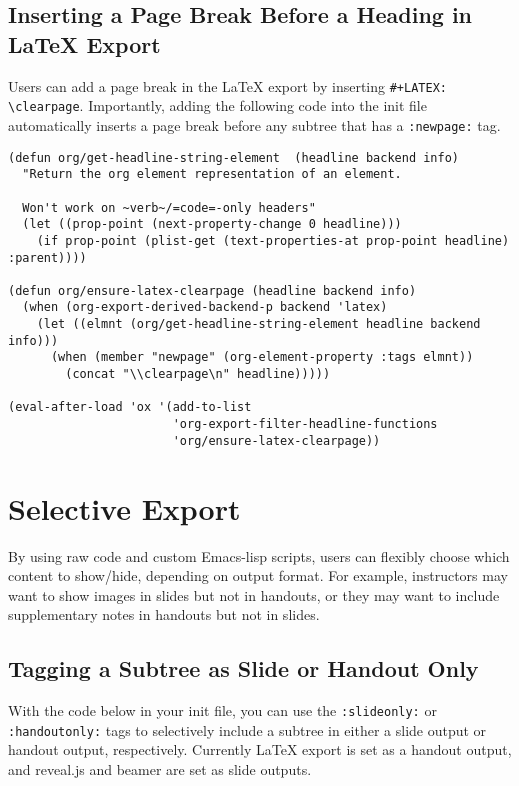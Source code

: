 \documentclass[10pt,article]{article}
\begin{document}
\subsection{Inserting a Page Break Before a Heading in \LaTeX{} Export}
\label{sec:org48c0563}
Users can add a page break in the \LaTeX{} export by inserting
\texttt{\#+LATEX: \textbackslash{}clearpage}. Importantly, adding the following code into the init file
automatically inserts a page break before any subtree that has a \texttt{:newpage:}
tag.

{\small
\begin{verbatim}
(defun org/get-headline-string-element  (headline backend info)
  "Return the org element representation of an element.

  Won't work on ~verb~/=code=-only headers"
  (let ((prop-point (next-property-change 0 headline)))
    (if prop-point (plist-get (text-properties-at prop-point headline) :parent))))

(defun org/ensure-latex-clearpage (headline backend info)
  (when (org-export-derived-backend-p backend 'latex)
    (let ((elmnt (org/get-headline-string-element headline backend info)))
      (when (member "newpage" (org-element-property :tags elmnt))
        (concat "\\clearpage\n" headline)))))

(eval-after-load 'ox '(add-to-list
                       'org-export-filter-headline-functions
                       'org/ensure-latex-clearpage))
\end{verbatim}
}
\section{Selective Export}
\label{sec:org90a1fb8}
By using raw code and custom Emacs-lisp scripts, users can flexibly
choose which content to show/hide, depending on output format. For
example, instructors may want to show images in slides but not in
handouts, or they may want to include supplementary notes in handouts but not in slides.
\subsection{Tagging a Subtree as Slide or Handout Only}
\label{sec:org55e4ab9}
With the code below in your init file, you can use the \texttt{:slideonly:} or
\texttt{:handoutonly:} tags to selectively include a subtree in either a slide output
or handout output, respectively. Currently \LaTeX{} export is set as a handout output, and
reveal.js and beamer are set as slide outputs.
\end{document}
